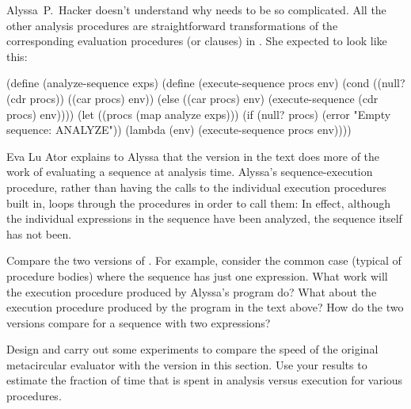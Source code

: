\begin{exercise}
	\label{Exercise 4.23}
	Alyssa~P.~Hacker doesn’t understand why  needs to be so complicated.
	All the other analysis procedures are straightforward transformations of the corresponding evaluation procedures (or  clauses) in .
	She expected  to look like this:
	\begin{scheme}
	  (define (analyze-sequence exps)
	    (define (execute-sequence procs env)
	      (cond ((null? (cdr procs))
	             ((car procs) env))
	            (else
	             ((car procs) env)
	             (execute-sequence (cdr procs) env))))
	    (let ((procs (map analyze exps)))
	      (if (null? procs)
	          (error "Empty sequence: ANALYZE"))
	      (lambda (env)
	        (execute-sequence procs env))))
	\end{scheme}
	Eva Lu Ator explains to Alyssa that the version in the text does more of the work of evaluating a sequence at analysis time.
	Alyssa’s sequence-execution procedure, rather than having the calls to the individual execution procedures built in, loops through the procedures in order to call them:
	In effect, although the individual expressions in the sequence have been analyzed, the sequence itself has not been.

	Compare the two versions of .
	For example, consider the common case (typical of procedure bodies) where the sequence has just one expression.
	What work will the execution procedure produced by Alyssa’s program do?
	What about the execution procedure produced by the program in the text above?
	How do the two versions compare for a sequence with two expressions?
\end{exercise}



\begin{exercise}
	\label{Exercise 4.24}
	Design and carry out some  experiments to compare the speed of the original metacircular evaluator with the version in this section.
	Use your results to estimate the fraction of time that is spent in analysis versus execution for various procedures.
\end{exercise}
